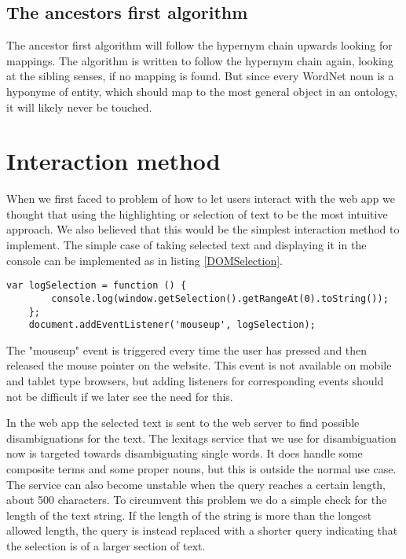 \subsection{The ancestors first algorithm}
The ancestor first algorithm will follow the hypernym chain upwards looking for mappings.
The algorithm is written to follow the hypernym chain again, looking at the sibling senses, if no mapping is found.
But since every WordNet noun is a hyponyme of {entity}, which should map to the most general object in an ontology,
it will likely never be touched.



\section{Interaction method}
\label{Interaction}
When we first faced to problem of how to let users interact with the web app we thought that using the highlighting or
selection of text to be the most intuitive approach.
We also believed that this would be the simplest interaction method to implement.
The simple case of taking selected text and displaying it in the console can be implemented as in listing \ref{DOMSelection}.

\begin{lstlisting}[caption={Logging selected text}, label=DOMSelection]
	var logSelection = function () {
		console.log(window.getSelection().getRangeAt(0).toString());
	};
	document.addEventListener('mouseup', logSelection);
\end{lstlisting}

The "mouseup" event is triggered every time the user has pressed and then released the mouse pointer on the website.
This event is not available on mobile and tablet type browsers,
but adding listeners for corresponding events should not be difficult if we later see the need for this.

In the web app the selected text is sent to the web server to find possible disambiguations for the text.
The lexitags service that we use for disambiguation now is targeted towards disambiguating single words.
It does handle some composite terms and some proper nouns, but this is outside the normal use case.
The service can also become unstable when the query reaches a certain length, about 500 characters.
To circumvent this problem we do a simple check for the length of the text string.
If the length of the string is more than the longest allowed length,
the query is instead replaced with a shorter query indicating that the selection is of a larger section of text.

